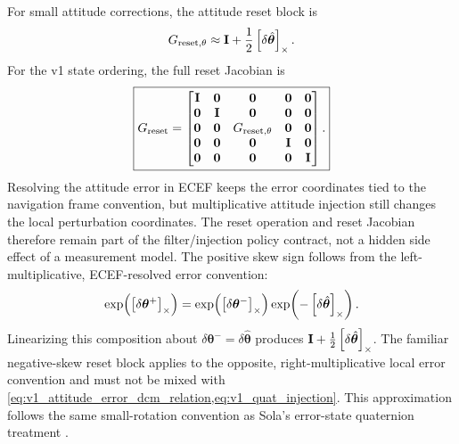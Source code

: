 For small attitude corrections, the attitude reset block is
\begin{equation}
G_{\text{reset},\theta}
\approx
\mathbf{I}+\frac{1}{2}\left[\delta\hat{\boldsymbol{\theta}}\right]_{\times}.
\label{eq:v1_attitude_reset_block}
\end{equation}
For the v1 state ordering, the full reset Jacobian is
\begin{equation}
\boxed{
G_{\text{reset}}
=
\begin{bmatrix}
\mathbf{I} & \mathbf{0} & \mathbf{0} & \mathbf{0} & \mathbf{0}\\
\mathbf{0} & \mathbf{I} & \mathbf{0} & \mathbf{0} & \mathbf{0}\\
\mathbf{0} & \mathbf{0} & G_{\text{reset},\theta} & \mathbf{0} & \mathbf{0}\\
\mathbf{0} & \mathbf{0} & \mathbf{0} & \mathbf{I} & \mathbf{0}\\
\mathbf{0} & \mathbf{0} & \mathbf{0} & \mathbf{0} & \mathbf{I}
\end{bmatrix}.
}
\label{eq:v1_full_reset_jacobian}
\end{equation}
Resolving the attitude error in ECEF keeps the error coordinates tied to the
navigation frame convention, but multiplicative attitude injection still
changes the local perturbation coordinates. The reset operation and reset
Jacobian therefore remain part of the filter/injection policy contract, not a
hidden side effect of a measurement model. The positive skew sign follows from
the left-multiplicative, ECEF-resolved error convention:
\begin{equation}
\exp\!\left(\left[\delta\boldsymbol{\theta}^{+}\right]_{\times}\right)
=
\exp\!\left(\left[\delta\boldsymbol{\theta}^{-}\right]_{\times}\right)
\exp\!\left(-\left[\delta\hat{\boldsymbol{\theta}}\right]_{\times}\right).
\end{equation}
Linearizing this composition about
$\delta\boldsymbol{\theta}^{-}=\delta\hat{\boldsymbol{\theta}}$ produces
$\mathbf{I}+\tfrac{1}{2}\left[\delta\hat{\boldsymbol{\theta}}\right]_{\times}$. The familiar
negative-skew reset block applies to the opposite, right-multiplicative local
error convention and must not be mixed with
\cref{eq:v1_attitude_error_dcm_relation,eq:v1_quat_injection}. This
approximation follows the same small-rotation convention as Sola's error-state
quaternion treatment \cite{sola2018}.
